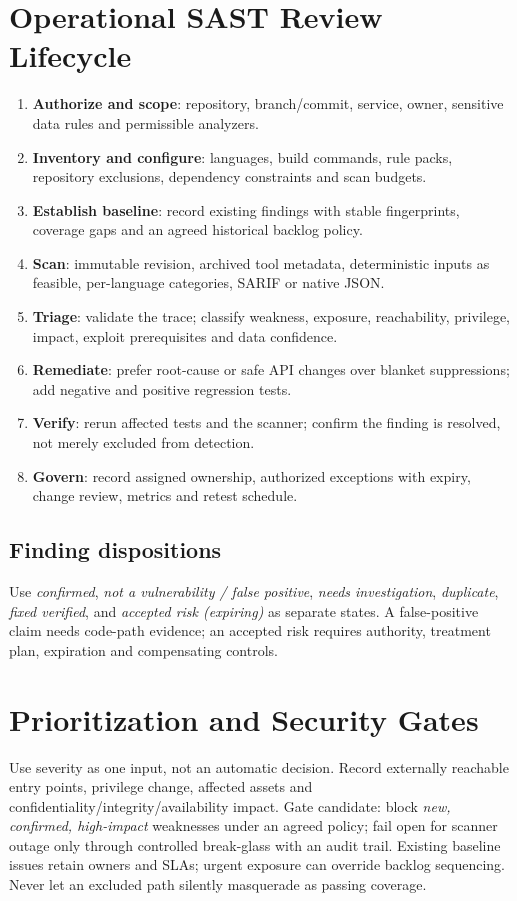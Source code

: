 \documentclass[10pt,letterpaper]{article}
\begin{document}
\section{Operational SAST Review Lifecycle}
\begin{enumerate}
\item \textbf{Authorize and scope}: repository, branch/commit, service, owner, sensitive data rules and permissible analyzers.
\item \textbf{Inventory and configure}: languages, build commands, rule packs, repository exclusions, dependency constraints and scan budgets.
\item \textbf{Establish baseline}: record existing findings with stable fingerprints, coverage gaps and an agreed historical backlog policy.
\item \textbf{Scan}: immutable revision, archived tool metadata, deterministic inputs as feasible, per-language categories, SARIF or native JSON.
\item \textbf{Triage}: validate the trace; classify weakness, exposure, reachability, privilege, impact, exploit prerequisites and data confidence.
\item \textbf{Remediate}: prefer root-cause or safe API changes over blanket suppressions; add negative and positive regression tests.
\item \textbf{Verify}: rerun affected tests and the scanner; confirm the finding is resolved, not merely excluded from detection.
\item \textbf{Govern}: record assigned ownership, authorized exceptions with expiry, change review, metrics and retest schedule.
\end{enumerate}
\subsection{Finding dispositions}
Use \emph{confirmed}, \emph{not a vulnerability / false positive}, \emph{needs investigation}, \emph{duplicate}, \emph{fixed verified}, and \emph{accepted risk (expiring)} as separate states. A false-positive claim needs code-path evidence; an accepted risk requires authority, treatment plan, expiration and compensating controls.
\section{Prioritization and Security Gates}
Use severity as one input, not an automatic decision. Record externally reachable entry points, privilege change, affected assets and confidentiality/integrity/availability impact. Gate candidate: block \emph{new, confirmed, high-impact} weaknesses under an agreed policy; fail open for scanner outage only through controlled break-glass with an audit trail. Existing baseline issues retain owners and SLAs; urgent exposure can override backlog sequencing. Never let an excluded path silently masquerade as passing coverage.
\end{document}
